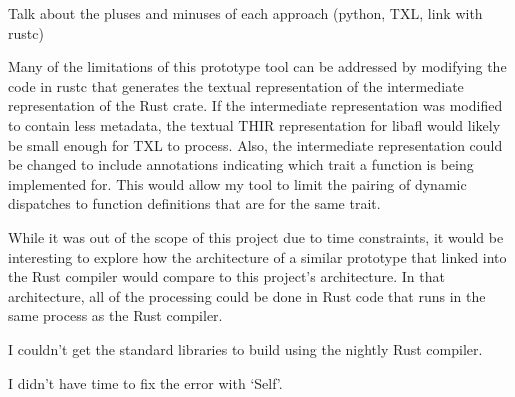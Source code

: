 \documentclass[11pt]{article}
\begin{document}
Talk about the pluses and minuses of each approach (python, TXL, link with rustc)

Many of the limitations of this prototype tool can be addressed by modifying the code in rustc that generates the textual representation of the intermediate representation of the Rust crate.
If the intermediate representation was modified to contain less metadata, the textual THIR representation for libafl would likely be small enough for TXL to process.
Also, the intermediate representation could be changed to include annotations indicating which trait a function is being implemented for.
This would allow my tool to limit the pairing of dynamic dispatches to function definitions that are for the same trait.

While it was out of the scope of this project due to time constraints, it would be interesting to explore how the architecture of a similar prototype that linked into the Rust compiler would compare to this project's architecture.
In that architecture, all of the processing could be done in Rust code that runs in the same process as the Rust compiler.

I couldn't get the standard libraries to build using the nightly Rust compiler.

I didn't have time to fix the error with `Self'.
\end{document}
